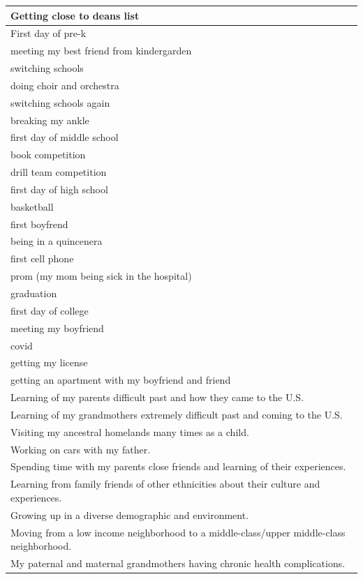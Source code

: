\documentclass[
  .7em,
  letterpaper,
  DIV=11,
  numbers=noendperiod]{scrartcl}
\begin{document}
\begin{table}
\begin{tabular}{l}
\hline
Getting close to deans list\\
\hline
First day of pre-k\\
\hline
meeting my best friend from kindergarden\\
\hline
switching schools\\
\hline
doing choir and orchestra\\
\hline
switching schools again\\
\hline
breaking my ankle\\
\hline
first day of middle school\\
\hline
book competition\\
\hline
drill team competition\\
\hline
first day of high school\\
\hline
basketball\\
\hline
first boyfrend\\
\hline
being in a quincenera\\
\hline
first cell phone\\
\hline
prom (my mom being sick in the hospital)\\
\hline
graduation\\
\hline
first day of college\\
\hline
meeting my boyfriend\\
\hline
covid\\
\hline
getting my license\\
\hline
getting an apartment with my boyfriend and friend\\
\hline
Learning of my parents difficult past and how they came to the U.S.\\
\hline
Learning of my grandmothers extremely difficult past and coming to the U.S.\\
\hline
Visiting my ancestral homelands many times as a child.\\
\hline
Working on cars with my father.\\
\hline
Spending time with my parents close friends and learning of their experiences.\\
\hline
Learning from family friends of other ethnicities about their culture and experiences.\\
\hline
Growing up in a diverse demographic and environment.\\
\hline
Moving from a low income neighborhood to a middle-class/upper middle-class neighborhood.\\
\hline
My paternal and maternal grandmothers having chronic health complications.\\

\end{tabular}
\end{table}
\end{document}
